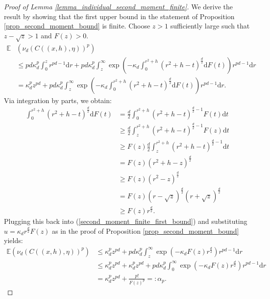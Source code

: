 \documentclass{article}
\newcommand{\EE}{\mathbb{E}}
\theoremstyle{plain}
\theoremstyle{remark}
\theoremstyle{definition}
\begin{document}
\begin{proof}[Proof of Lemma \ref{lemma_individual_second_moment_finite}]
    We derive the result by showing that the first upper bound in the statement of Proposition \ref{prop_second_moment_bound} is finite. Choose $z > 1$ sufficiently large such that $z - \sqrt{z} > 1$ and $F(z) > 0$.
    \begin{align}
        \EE&\left(\nu_d(C((x,h),\eta))^p\right) \nonumber  \\
        &\leq pd\kappa_d^p\int_0^zr^{pd-1}\mathrm{d}r + pd\kappa_d^p\int_z^\infty \exp\left(-\kappa_d\int_0^{r^2 + h}\left(r^2 + h -t \right)^\frac{d}{2}\mathrm{d}F(t)\right)r^{pd-1}\mathrm{d}r \nonumber \\
        &= \kappa_d^pz^{pd} + pd\kappa_d^p\int_z^\infty \exp\left(-\kappa_d\int_0^{r^2 + h}\left(r^2 + h -t \right)^\frac{d}{2}\mathrm{d}F(t)\right)r^{pd-1}\mathrm{d}r. \label{second_moment_finite_first_bound}
    \end{align}
     Via integration by parts, we obtain:
     {\allowdisplaybreaks
     \begin{align*}
        \int_0^{r^2 + h}\left(r^2 + h -t \right)^\frac{d}{2}\mathrm{d}F(t) &= \frac{d}{2}\int_0^{r^2 + h}\left(r^2 + h -t \right)^{\frac{d}{2}-1}F(t)\mathrm{d}t \\
        &\geq \frac{d}{2}\int_z^{r^2 + h}\left(r^2 + h -t \right)^{\frac{d}{2}-1}F(z)\mathrm{d}t \\
        &\geq F(z)\frac{d}{2}\int_z^{r^2 + h}\left(r^2 + h -t \right)^{\frac{d}{2}-1}\mathrm{d}t \\
        &= F(z)(r^2 +h - z)^\frac{d}{2}\\
        &\geq F(z)(r^2 - z)^\frac{d}{2} \\
        &= F(z)(r-\sqrt{z})^\frac{d}{2}(r+ \sqrt{z})^\frac{d}{2}\\
        &\geq F(z)r^\frac{d}{2}.
    \end{align*}
     }%
    Plugging this back into (\ref{second_moment_finite_first_bound}) and substituting $u = \kappa_d r^\frac{d}{2}F(z)$ as in the proof of Proposition \ref{prop_second_moment_bound} yields:
    \begin{align*}
        \EE\left(\nu_d(C((x,h),\eta))^p\right) &\leq \kappa_d^p z^{pd} + pd\kappa_d^p\int_z^\infty \exp\left(-\kappa_d F(z)r^{\frac{d}{2}}\right)r^{pd-1}\mathrm{d}r \\
        &\leq \kappa_d^pz^{pd} + \kappa_d^p z^{pd} + pd\kappa_d^p\int_0^\infty \exp\left(-\kappa_d F(z)r^{\frac{d}{2}}\right)r^{pd-1}\mathrm{d}r \\
        &= \kappa_d^pz^{pd} + \frac{p!}{F(z)^p} =:\alpha_p.
    \end{align*}
\end{proof}
\end{document}
